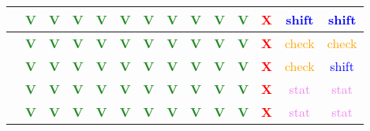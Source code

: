\begin{frame}
{\begin{tabular}{|c||*{13}{c|}}
\hline
[283-344] & \textcolor{ForestGreen}{\textbf{V}} & \textcolor{ForestGreen}{\textbf{V}} & \textcolor{ForestGreen}{\textbf{V}} & \textcolor{ForestGreen}{\textbf{V}} & \textcolor{ForestGreen}{\textbf{V}} & \textcolor{ForestGreen}{\textbf{V}} & \textcolor{ForestGreen}{\textbf{V}} & \textcolor{ForestGreen}{\textbf{V}} & \textcolor{ForestGreen}{\textbf{V}} & \textcolor{ForestGreen}{\textbf{V}} & \textcolor{Red}{\textbf{X}} & \textcolor{blue}{shift} & \textcolor{blue}{shift} \\
\hline
[344-443] & \textcolor{ForestGreen}{\textbf{V}} & \textcolor{ForestGreen}{\textbf{V}} & \textcolor{ForestGreen}{\textbf{V}} & \textcolor{ForestGreen}{\textbf{V}} & \textcolor{ForestGreen}{\textbf{V}} & \textcolor{ForestGreen}{\textbf{V}} & \textcolor{ForestGreen}{\textbf{V}} & \textcolor{ForestGreen}{\textbf{V}} & \textcolor{ForestGreen}{\textbf{V}} & \textcolor{ForestGreen}{\textbf{V}} & \textcolor{Red}{\textbf{X}} & \textcolor{orange}{check} & \textcolor{orange}{check} \\
\hline
[443-577] & \textcolor{ForestGreen}{\textbf{V}} & \textcolor{ForestGreen}{\textbf{V}} & \textcolor{ForestGreen}{\textbf{V}} & \textcolor{ForestGreen}{\textbf{V}} & \textcolor{ForestGreen}{\textbf{V}} & \textcolor{ForestGreen}{\textbf{V}} & \textcolor{ForestGreen}{\textbf{V}} & \textcolor{ForestGreen}{\textbf{V}} & \textcolor{ForestGreen}{\textbf{V}} & \textcolor{ForestGreen}{\textbf{V}} & \textcolor{Red}{\textbf{X}} & \textcolor{orange}{check} & \textcolor{blue}{shift} \\
\hline
[577-606] & \textcolor{ForestGreen}{\textbf{V}} & \textcolor{ForestGreen}{\textbf{V}} & \textcolor{ForestGreen}{\textbf{V}} & \textcolor{ForestGreen}{\textbf{V}} & \textcolor{ForestGreen}{\textbf{V}} & \textcolor{ForestGreen}{\textbf{V}} & \textcolor{ForestGreen}{\textbf{V}} & \textcolor{ForestGreen}{\textbf{V}} & \textcolor{ForestGreen}{\textbf{V}} & \textcolor{ForestGreen}{\textbf{V}} & \textcolor{Red}{\textbf{X}} & \textcolor{violet}{stat} & \textcolor{violet}{stat} \\
\hline
[606-1500] & \textcolor{ForestGreen}{\textbf{V}} & \textcolor{ForestGreen}{\textbf{V}} & \textcolor{ForestGreen}{\textbf{V}} & \textcolor{ForestGreen}{\textbf{V}} & \textcolor{ForestGreen}{\textbf{V}} & \textcolor{ForestGreen}{\textbf{V}} & \textcolor{ForestGreen}{\textbf{V}} & \textcolor{ForestGreen}{\textbf{V}} & \textcolor{ForestGreen}{\textbf{V}} & \textcolor{ForestGreen}{\textbf{V}} & \textcolor{Red}{\textbf{X}} & \textcolor{violet}{stat} & \textcolor{violet}{stat} \\
\hline
\end{tabular}
}
\end{frame}

